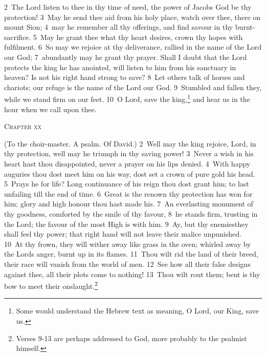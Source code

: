 \documentclass[10pt]{book} %
\begin{document}
\textcolor{benred8}{2}~The Lord listen to thee in thy time of need, the power of Jacob\textquotesingle s God be thy protection! \textcolor{benred8}{3}~May he send thee aid from his holy place, watch over thee, there on mount Sion; \textcolor{benred8}{4}~may he remember all thy offerings, and find savour in thy burnt-sacrifice. \textcolor{benred8}{5}~May he grant thee what thy heart desires, crown thy hopes with fulfilment. \textcolor{benred8}{6}~So may we rejoice at thy deliverance, rallied in the name of the Lord our God; \textcolor{benred8}{7}~abundantly may he grant thy prayer. Shall I doubt that the Lord protects the king he has anointed, will listen to him from his sanctuary in heaven? Is not his right hand strong to save? \textcolor{benred8}{8}~Let others talk of horses and chariots; our refuge is the name of the Lord our God. \textcolor{benred8}{9}~Stumbled and fallen they, while we stand firm on our feet. \textcolor{benred8}{10}~O Lord, save the king,\footnote[1]{Some would understand the Hebrew text as meaning, \textasciigrave O Lord, our King, save us\textquotesingle .} and hear us in the hour when we call upon thee.
\begin{large}\begin{center}\textsc{Chapter xx}\end{center}\end{large}
(To the choir-master. A psalm. Of David.)
\textcolor{benred8}{2}~Well may the king rejoice, Lord, in thy protection, well may he triumph in thy saving power! \textcolor{benred8}{3}~Never a wish in his heart hast thou disappointed, never a prayer on his lips denied. \textcolor{benred8}{4}~With happy auguries thou dost meet him on his way, dost set a crown of pure gold his head. \textcolor{benred8}{5}~Prays he for life? Long continuance of his reign thou dost grant him; to last unfailing till the end of time. \textcolor{benred8}{6}~Great is the renown thy protection has won for him; glory and high honour thou hast made his. \textcolor{benred8}{7}~An everlasting monument of thy goodness, comforted by the smile of thy favour, \textcolor{benred8}{8}~he stands firm, trusting in the Lord; the favour of the most High is with him.
\textcolor{benred8}{9}~Ay, but thy enemies\textemdash they shall feel thy power; that right hand will not leave their malice unpunished. \textcolor{benred8}{10}~At thy frown, they will wither away like grass in the oven; whirled away by the Lord\textquotesingle s anger, burnt up in its flames. \textcolor{benred8}{11}~Thou wilt rid the land of their breed, their race will vanish from the world of men. \textcolor{benred8}{12}~See how all their false designs against thee, all their plots come to nothing! \textcolor{benred8}{13}~Thou wilt rout them; bent is thy bow to meet their onslaught.\footnote[1]{Verses 9-13 are perhaps addressed to God, more probably to the psalmist himself.}
\end{document}
